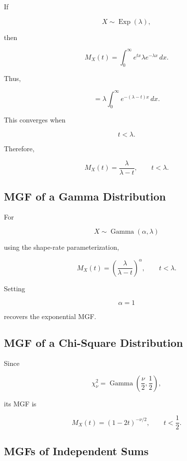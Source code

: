 If

\[
X\sim\operatorname{Exp}(\lambda),
\]

then

\[
M_X(t)
=
\int_0^\infty
e^{tx}
\lambda e^{-\lambda x}
\,dx.
\]

Thus,

\[
=
\lambda
\int_0^\infty
e^{-(\lambda-t)x}
\,dx.
\]

This converges when

\[
t<\lambda.
\]

Therefore,

\[
\boxed{
M_X(t)
=
\frac{\lambda}{\lambda-t},
\qquad
t<\lambda.
}
\]

\subsection{MGF of a Gamma Distribution}
\label{subsec:mgf-gamma}

For

\[
X\sim\operatorname{Gamma}(\alpha,\lambda)
\]

using the shape-rate parameterization,

\[
\boxed{
M_X(t)
=
\left(
\frac{\lambda}{\lambda-t}
\right)^\alpha,
\qquad
t<\lambda.
}
\]

Setting

\[
\alpha=1
\]

recovers the exponential MGF.

\subsection{MGF of a Chi-Square Distribution}
\label{subsec:mgf-chi-square}

Since

\[
\chi^2_\nu
=
\operatorname{Gamma}
\left(
\frac{\nu}{2},
\frac12
\right),
\]

its MGF is

\[
\boxed{
M_X(t)
=
(1-2t)^{-\nu/2},
\qquad
t<\frac12.
}
\]

\subsection{MGFs of Independent Sums}
\label{subsec:mgf-independent-sums}

